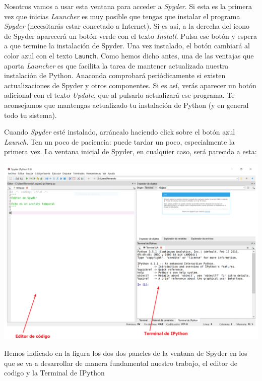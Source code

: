 \documentclass[10pt,a4paper]{article}\usepackage[]{graphicx}\usepackage[]{color}
\begin{document}
Nosotros vamos a usar esta ventana para acceder a {\em Spyder}. Si esta es la primera vez que inicias {\em Launcher} es muy posible que tengas que instalar el programa {\em Spyder} (necesitarás estar conectado a Internet). Si es así, a la derecha del icono de Spyder aparecerá un botón verde con el texto {\em Install}. Pulsa ese botón y espera a que termine la instalación de Spyder. Una vez instalado, el botón cambiará al color azul con el texto {\tt Launch}. Como hemos dicho antes, una de las ventajas que aporta {\em Launcher} es que facilita la tarea de mantener actualizada nuestra instalación de Python. Anaconda comprobará periódicamente si existen actualizaciones de Spyder y otros componentes. Si es así, verás aparecer un botón adicional con el texto {\em Update}, que al pulsarlo actualizará ese programa. Te aconsejamos que mantengas actualizado tu instalación de Python (y en general todo tu sistema).

Cuando {\em Spyder} esté instalado, arráncalo haciendo click sobre el botón azul {\em Launch}. Ten un poco de paciencia: puede tardar un poco, especialmente la primera vez. La ventana inicial de Spyder, en cualquier caso, será parecida a esta:

\begin{center}
\includegraphics[width=14.5cm]{../fig/Tut-00-py-17-Spyder.png}\\[1cm]
\end{center}

Hemos indicado en la figura los dos dos paneles de la ventana de Spyder en los que se va a desarrollar de manera fundamental nuestro trabajo, el {\sf editor de codigo} y la {\sf Terminal de IPython}
\end{document}
